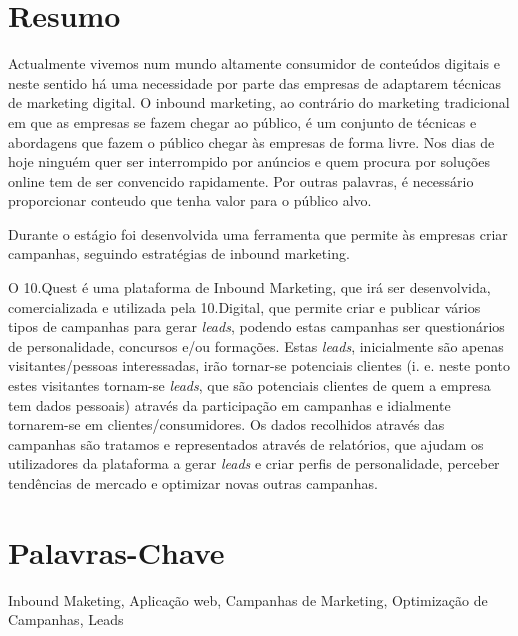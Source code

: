 \section*{Resumo}
\label{sec:resumo}

Actualmente vivemos num mundo altamente consumidor de conteúdos digitais e neste sentido há uma necessidade por parte das empresas de adaptarem técnicas de marketing digital. O inbound marketing, ao contrário do marketing tradicional em que as empresas se fazem chegar ao público, é um conjunto de técnicas e abordagens que fazem o público chegar às empresas de forma livre. Nos dias de hoje ninguém quer ser interrompido por anúncios e quem procura por soluções online tem de ser convencido rapidamente. Por outras palavras, é necessário proporcionar conteudo que tenha valor para o público alvo.

Durante o estágio foi desenvolvida uma ferramenta que permite às empresas criar campanhas, seguindo estratégias de inbound marketing. 

O 10.Quest é uma plataforma de Inbound Marketing, que irá ser desenvolvida, comercializada e utilizada pela 10.Digital, que permite criar e publicar vários tipos de campanhas para gerar \textit{leads}, podendo estas campanhas ser questionários de personalidade, concursos e/ou formações. Estas \textit{leads}, inicialmente são apenas visitantes/pessoas interessadas, irão tornar-se potenciais clientes (i. e. neste ponto estes visitantes tornam-se \textit{leads}, que são potenciais clientes de quem a empresa tem dados pessoais) através da participação em campanhas e idialmente tornarem-se em clientes/consumidores. Os dados recolhidos através das campanhas são tratamos e representados através de relatórios, que ajudam os utilizadores da plataforma a gerar \textit{leads} e criar perfis de personalidade, perceber tendências de mercado e optimizar novas outras campanhas.



\section*{Palavras-Chave}
\label{sec:palavras}

Inbound Maketing, Aplicação web, Campanhas de Marketing, Optimização de Campanhas, Leads 

